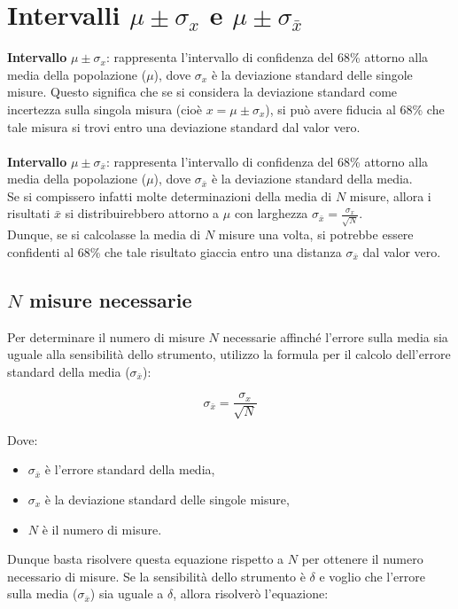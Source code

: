\documentclass{article}
\begin{document}
\section{Intervalli $\mu \pm \sigma_x$ e $\mu \pm \sigma_{\bar{x}}$} 
\textbf{Intervallo} $\mu \pm \sigma_x$: rappresenta l'intervallo di confidenza del 68\% attorno alla media della popolazione ($\mu$), dove $\sigma_x$ è la deviazione standard delle singole misure. Questo significa che se si considera la deviazione standard come incertezza sulla singola misura (cioè $x = \mu \pm \sigma_x$), si può avere fiducia al 68\% che tale misura si trovi entro una deviazione standard dal valor vero.
\\\\ \noindent\textbf{Intervallo} $\mu \pm \sigma_{\bar{x}}$: rappresenta l'intervallo di confidenza del 68\% attorno alla media della popolazione ($\mu$), dove $\sigma_{\bar{x}}$ è la deviazione standard della media.
\\Se si compissero infatti molte determinazioni della media di $N$ misure, allora i risultati $\bar{x}$ si distribuirebbero attorno a $\mu$ con larghezza $\sigma_{\bar{x}} =  \frac{\sigma_x}{\sqrt{N}} $.
\\ Dunque, se si calcolasse la media di $N$ misure una volta, si potrebbe essere confidenti al 68\% che tale risultato giaccia entro una distanza $ \sigma_{\bar{x}}$ dal valor vero.

\subsection{$N$ misure necessarie}
Per determinare il numero di misure $N$ necessarie affinché l'errore sulla media sia uguale alla sensibilità dello strumento, utilizzo la formula per il calcolo dell'errore standard della media ($\sigma_{\bar{x}}$):

\[\sigma_{\bar{x}} = \frac{\sigma_x}{\sqrt{N}}\]

\noindent Dove:
\begin{itemize}
  \item $\sigma_{\bar{x}}$ è l'errore standard della media,
  \item $\sigma_x$ è la deviazione standard delle singole misure,
  \item $N$ è il numero di misure.
\end{itemize}

\noindent Dunque basta risolvere questa equazione rispetto a $N$ per ottenere il numero necessario di misure. Se la sensibilità dello strumento è $\delta$ e voglio che l'errore sulla media ($\sigma_{\bar{x}}$) sia uguale a $\delta$, allora risolverò l'equazione:
\end{document}
